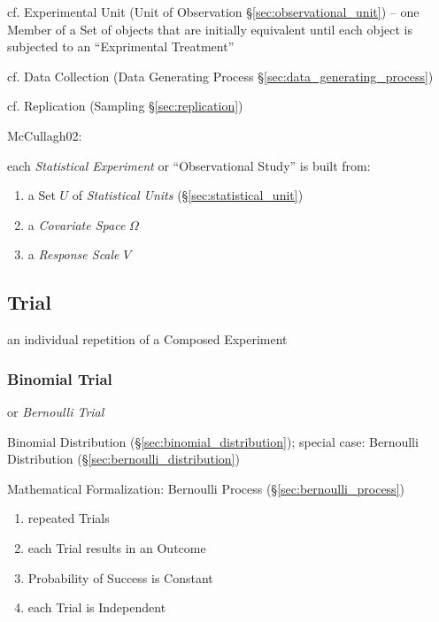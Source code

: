 \fist cf. Experimental Unit (Unit of Observation \S\ref{sec:observational_unit})
-- one Member of a Set of objects that are initially equivalent until each
object is subjected to an ``Exprimental Treatment''

\fist cf. Data Collection (Data Generating Process
\S\ref{sec:data_generating_process})

\fist cf. Replication (Sampling \S\ref{sec:replication})

\asterism


McCullagh02:

each \emph{Statistical Experiment} or ``Observational Study'' is built from:
\begin{enumerate}
  \item a Set $U$ of \emph{Statistical Units} (\S\ref{sec:statistical_unit})
  \item a \emph{Covariate Space} $\Omega$
  \item a \emph{Response Scale} $V$
\end{enumerate}



\subsection{Trial}\label{sec:trial}

an individual repetition of a Composed Experiment



\subsubsection{Binomial Trial}\label{sec:binomial_trial}

or \emph{Bernoulli Trial}

Binomial Distribution (\S\ref{sec:binomial_distribution}); special case:
Bernoulli Distribution (\S\ref{sec:bernoulli_distribution})

Mathematical Formalization: Bernoulli Process (\S\ref{sec:bernoulli_process})

\begin{enumerate}
  \item repeated Trials
  \item each Trial results in an Outcome
  \item Probability of Success is Constant
  \item each Trial is Independent
\end{enumerate}

